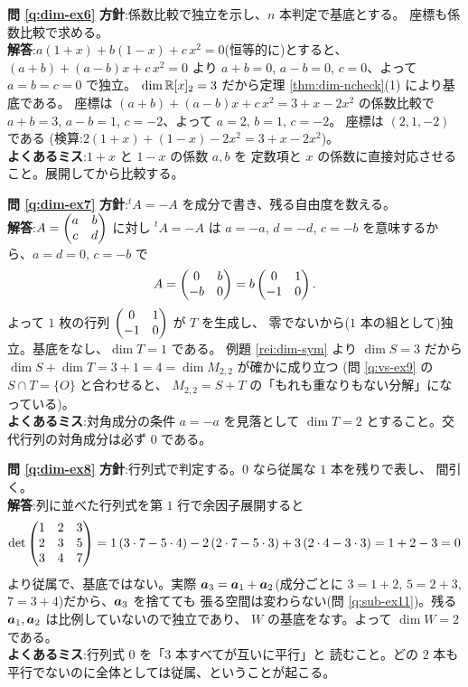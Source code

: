 \bigskip
\noindent\textbf{問 \ref{q:dim-ex6}}\quad
\textbf{方針}:係数比較で独立を示し、$n$ 本判定で基底とする。
座標も係数比較で求める。\\
\textbf{解答}:$a(1 + x) + b(1 - x) + c\,x^2 = 0$(恒等的に)とすると、
$(a + b) + (a - b)x + c\,x^2 = 0$ より
$a + b = 0$, $a - b = 0$, $c = 0$、よって $a = b = c = 0$ で独立。
$\dim \mathbb{R}[x]_2 = 3$ だから定理 \ref{thm:dim-ncheck}(1) により基底である。
座標は $(a + b) + (a - b)x + c\,x^2 = 3 + x - 2x^2$ の係数比較で
$a + b = 3$, $a - b = 1$, $c = -2$、よって $a = 2$, $b = 1$, $c = -2$。
座標は $(2, 1, -2)$ である
(検算:$2(1 + x) + (1 - x) - 2x^2 = 3 + x - 2x^2$)。\\
\textbf{よくあるミス}:$1 + x$ と $1 - x$ の係数 $a, b$ を
定数項と $x$ の係数に直接対応させること。展開してから比較する。

\bigskip
\noindent\textbf{問 \ref{q:dim-ex7}}\quad
\textbf{方針}:${}^t\!A = -A$ を成分で書き、残る自由度を数える。\\
\textbf{解答}:$A = \begin{pmatrix}a & b \\ c & d\end{pmatrix}$ に対し ${}^t\!A = -A$ は
$a = -a$, $d = -d$, $c = -b$ を意味するから、$a = d = 0$, $c = -b$ で
\[
A = \begin{pmatrix}0 & b \\ -b & 0\end{pmatrix} = b\begin{pmatrix}0 & 1 \\ -1 & 0\end{pmatrix}.
\]
よって $1$ 枚の行列 $\begin{pmatrix}0 & 1 \\ -1 & 0\end{pmatrix}$ が $T$ を生成し、
零でないから($1$ 本の組として)独立。基底をなし、$\dim T = 1$ である。
例題 \ref{rei:dim-sym} より $\dim S = 3$ だから
$\dim S + \dim T = 3 + 1 = 4 = \dim M_{2,2}$ が確かに成り立つ
(問 \ref{q:vs-ex9} の $S \cap T = \{O\}$ と合わせると、
$M_{2,2} = S + T$ の「もれも重なりもない分解」になっている)。\\
\textbf{よくあるミス}:対角成分の条件 $a = -a$ を見落として
$\dim T = 2$ とすること。交代行列の対角成分は必ず $0$ である。

\bigskip
\noindent\textbf{問 \ref{q:dim-ex8}}\quad
\textbf{方針}:行列式で判定する。$0$ なら従属な $1$ 本を残りで表し、
間引く。\\
\textbf{解答}:列に並べた行列式を第 $1$ 行で余因子展開すると
\[
\det \begin{pmatrix}1 & 2 & 3 \\ 2 & 3 & 5 \\ 3 & 4 & 7\end{pmatrix}
= 1\,(3 \cdot 7 - 5 \cdot 4) - 2\,(2 \cdot 7 - 5 \cdot 3)
+ 3\,(2 \cdot 4 - 3 \cdot 3) = 1 + 2 - 3 = 0
\]
より従属で、基底ではない。実際
$\bm{a}_3 = \bm{a}_1 + \bm{a}_2$(成分ごとに
$3 = 1 + 2$, $5 = 2 + 3$, $7 = 3 + 4$)だから、$\bm{a}_3$ を捨てても
張る空間は変わらない(問 \ref{q:sub-ex11})。残る
$\bm{a}_1, \bm{a}_2$ は比例していないので独立であり、
$W$ の基底をなす。よって $\dim W = 2$ である。\\
\textbf{よくあるミス}:行列式 $0$ を「$3$ 本すべてが互いに平行」と
読むこと。どの $2$ 本も平行でないのに全体としては従属、ということが起こる。

